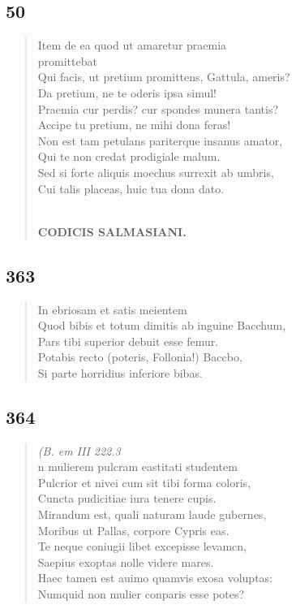 \documentclass[11pt, a4paper]{report}
\begin{document}
            \subsection*{50}
      \begin{verse}
      Item de ea quod ut amaretur praemia \\ promittebat \\ Qui facis, ut pretium promittens, Gattula, ameris? \\ Da pretium, ne te oderis ipsa simul! \\ Praemia cur perdis? cur spondes munera tantis? \\ Accipe tu pretium, ne mihi dona feras! \\ Non est tam petulans pariterque insanus amator, \\ Qui te non credat prodigiale malum. \\ Sed si forte aliquis moechus surrexit ab umbris, \\ Cui talis placeas, huic tua dona dato. \\ 
        ﻿\pagebreak 
    \begin{center} \textbf{CODICIS SALMASIANI.} \end{center} \marginpar{[283]} 
      \end{verse}
  
            \subsection*{363}
      \begin{verse}
      In ebriosam et satis meientem \\ Quod bibis  \lbrack et \rbrack  totum dimitis ab inguine Bacchum, \\ Pars tibi superior debuit esse femur. \\ Potabis recto (poteris, Follonia!) Baccbo, \\ Si parte horridius inferiore bibas. \\ 
      \end{verse}
  
            \subsection*{364}
      \begin{verse}
      \textit{(B. em III 222.3} \\ n mulierem pulcram eastitati studentem \\ Pulcrior et nivei cum sit tibi forma coloris, \\ Cuncta pudicitiae iura tenere cupis. \\ Mirandum est, quali naturam laude gubernes, \\ Moribus ut Pallas, corpore Cypris eas. \\ Te neque coniugii libet excepisse levamcn, \\ Saepius exoptas nolle videre mares. \\ Haec tamen est auimo quamvis exosa voluptas: \\ Numquid non mulier conparis esse potes? \\ 
      \end{verse}
  
\end{document}
